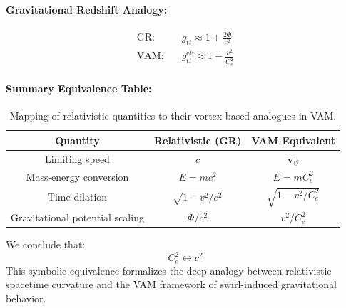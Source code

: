 \documentclass[12pt]{article}
\begin{document}
\paragraph{Gravitational Redshift Analogy:}
\begin{align*}
    \text{GR:}\quad & g_{tt} \approx 1 + \frac{2\Phi}{c^2} \\
    \text{VAM:}\quad & g_{tt}^{\text{eff}} \approx 1 - \frac{v^2}{C_e^2}
\end{align*}

\paragraph{Summary Equivalence Table:}
\begin{table}[H]
    \centering
    \renewcommand{\arraystretch}{1.3}
    \begin{tabular}{|c|c|c|}
        \hline
        \textbf{Quantity} & \textbf{Relativistic (GR)} & \textbf{VAM Equivalent} \\
        \hline
        Limiting speed & \( c \) & \( \mathbf{v}_{\scriptscriptstyle\boldsymbol{\circlearrowleft}} \) \\
        Mass-energy conversion & \( E = mc^2 \) & \( E = m C_e^2 \) \\
        Time dilation & \( \sqrt{1 - v^2/c^2} \) & \( \sqrt{1 - v^2/C_e^2} \) \\
        Gravitational potential scaling & \( \Phi/c^2 \) & \( v^2/C_e^2 \) \\
        \hline
    \end{tabular}
    \caption{Mapping of relativistic quantities to their vortex-based analogues in VAM.}
\end{table}

\noindent
We conclude that:
\[
    \boxed{C_e^2 \longleftrightarrow c^2}
\]
This symbolic equivalence formalizes the deep analogy between relativistic spacetime curvature and the VAM framework of swirl-induced gravitational behavior.



\ifdefined\standalonechapter\else
    
    
    
\end{document}
